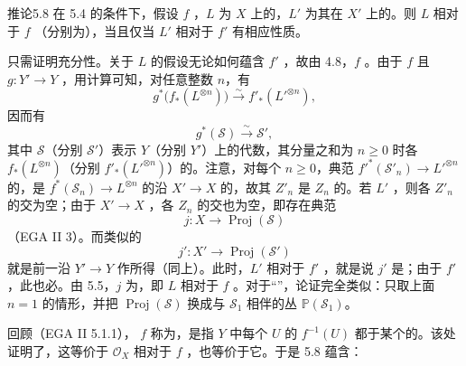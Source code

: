 \begin{SGAresult}{推论}{5.8}
在 5.4 的条件下，假设 $f$ ，$L$ 为 $X$ 上的，$L'$ 为其在 $X'$ 上的。则 $L$ 相对于 $f$ （分别为），当且仅当 $L'$ 相对于 $f'$ 有相应性质。
\end{SGAresult}
只需证明充分性。关于 $L$ 的假设无论如何蕴含 $f'$ ，故由 4.8，$f$ 。由于 $f$ 且 $g:Y'\to Y$ ，用计算可知，对任意整数 $n$，有
\[
g^*\bigl(f_*(L^{\otimes n})\bigr)\xrightarrow{\sim}f'_*(L'^{\otimes n}),
\]
因而有
\[
g^*(\mathcal S)\xrightarrow{\sim}\mathcal S',
\]
其中 $\mathcal S$（分别 $\mathcal S'$）表示 $Y$（分别 $Y'$）上的代数，其分量之和为 $n\geq0$ 时各 $f_*(L^{\otimes n})$（分别 $f'_*(L'^{\otimes n})$）的。注意，对每个 $n\geq0$，典范 $f'^*(\mathcal S'_n)\to L'^{\otimes n}$ 的，是 $f^*(\mathcal S_n)\to L^{\otimes n}$ 的沿 $X'\to X$ 的，故其 $Z'_n$ 是 $Z_n$ 的。若 $L'$ ，则各 $Z'_n$ 的交为空；由于 $X'\to X$ ，各 $Z_n$ 的交也为空，即存在典范
\[
j:X\longrightarrow\operatorname{Proj}(\mathcal S)
\]
（EGA II 3）。而类似的
\[
j':X'\longrightarrow\operatorname{Proj}(\mathcal S')
\]
就是前一沿 $Y'\to Y$ 作所得（同上）。此时，$L'$ 相对于 $f'$ ，就是说 $j'$ 是；由于 $f'$ ，此也必。由 5.5，$j$ 为，即 $L$ 相对于 $f$ 。对于“”，论证完全类似：只取上面 $n=1$ 的情形，并把 $\operatorname{Proj}(\mathcal S)$ 换成与 $\mathcal S_1$ 相伴的丛 $\mathbb P(\mathcal S_1)$。

回顾（EGA II 5.1.1）， $f$ 称为，是指 $Y$ 中每个 $U$ 的 $f^{-1}(U)$ 都于某个的。该处证明了，这等价于 $\mathcal O_X$ 相对于 $f$ ，也等价于它。于是 5.8 蕴含：

